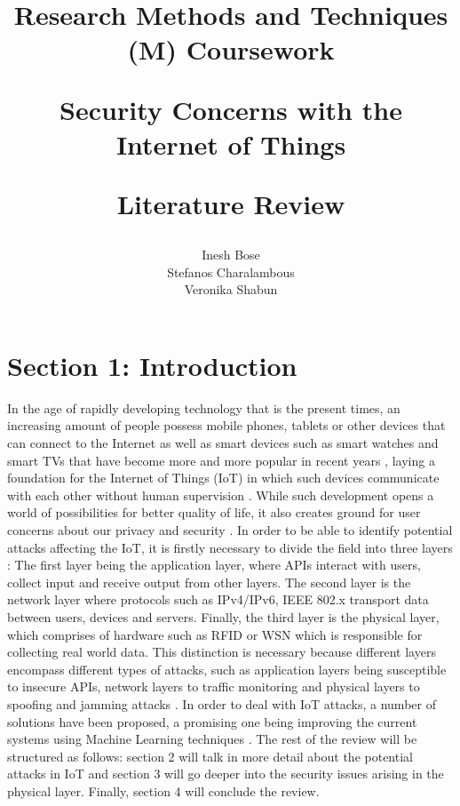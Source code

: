 \documentclass[11pt,a4paper]{article}
\title{%
    {\Large Research Methods and Techniques (M) Coursework \par}
    {\Huge Security Concerns with the Internet of Things \par}
    {\large Literature Review \par}
    \large
}
\author{%
    Inesh Bose\\
    Stefanos Charalambous\\
    Veronika Shabun
}
\date{}
\begin{document}
 

\maketitle


\section*{Section 1: Introduction}

In the age of rapidly developing technology that is the present times, an increasing amount of people possess mobile phones, tablets or other devices that can connect to the Internet as well as smart devices such as smart watches and smart TVs that have become more and more popular in recent years \cite{4}, laying a foundation for the Internet of Things (IoT) in which such devices communicate with each other without human supervision \cite{7}. While such development opens a world of possibilities for better quality of life, it also creates ground for user concerns about our privacy and security \cite{4}. In order to be able to identify potential attacks affecting the IoT, it is firstly necessary to divide the field into three layers \cite{7}: The first layer being the application layer, where APIs interact with users, collect input and receive output from other layers. The second layer is the network layer where protocols such as IPv4/IPv6, IEEE 802.x transport data between users, devices and servers. Finally, the third layer is the physical layer, which comprises of hardware such as RFID or WSN which is responsible for collecting real world data. This distinction is necessary because different layers encompass different types of attacks, such as application layers being susceptible to insecure APIs, network layers to traffic monitoring and physical layers to spoofing and jamming attacks \cite{1}. In order to deal with IoT attacks, a number of solutions have been proposed, a promising one being improving the current systems using Machine Learning techniques \cite{9}. The rest of the review will be structured as follows: section 2 will talk in more detail about the potential attacks in IoT and section 3 will go deeper into the security issues arising in the physical layer. Finally, section 4 will conclude the review.

\end{document}
